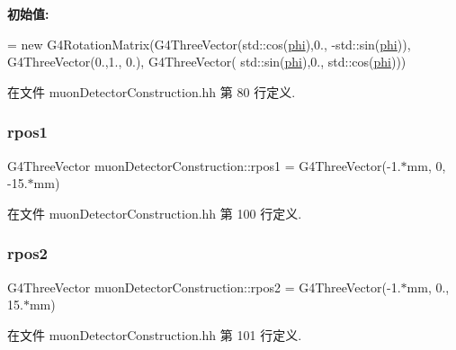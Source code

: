 {\bfseries 初始值\+:}
\begin{DoxyCode}
= 
    \textcolor{keyword}{new} G4RotationMatrix(G4ThreeVector(std::cos(\hyperlink{classmuonDetectorConstruction_ae2913b2b14fcbf88711169912921c19d}{phi}),0., -std::sin(\hyperlink{classmuonDetectorConstruction_ae2913b2b14fcbf88711169912921c19d}{phi})), 
    G4ThreeVector(0.,1., 0.), G4ThreeVector( std::sin(\hyperlink{classmuonDetectorConstruction_ae2913b2b14fcbf88711169912921c19d}{phi}),0., std::cos(\hyperlink{classmuonDetectorConstruction_ae2913b2b14fcbf88711169912921c19d}{phi})))
\end{DoxyCode}


在文件 muon\+Detector\+Construction.\+hh 第 80 行定义.

\mbox{\label{classmuonDetectorConstruction_a3a49ae955ac065b568c7db42c570cd75}} 
\subsubsection{\texorpdfstring{rpos1}{rpos1}}
{\footnotesize\ttfamily G4\+Three\+Vector muon\+Detector\+Construction\+::rpos1 = G4\+Three\+Vector(-\/1.$\ast$mm, 0, -\/15.$\ast$mm)\hspace{0.3cm}{\ttfamily [private]}}



在文件 muon\+Detector\+Construction.\+hh 第 100 行定义.

\mbox{\label{classmuonDetectorConstruction_a95836d910644b3c728b3fe4c0d2bdc28}} 
\subsubsection{\texorpdfstring{rpos2}{rpos2}}
{\footnotesize\ttfamily G4\+Three\+Vector muon\+Detector\+Construction\+::rpos2 = G4\+Three\+Vector(-\/1.$\ast$mm, 0., 15.$\ast$mm)\hspace{0.3cm}{\ttfamily [private]}}



在文件 muon\+Detector\+Construction.\+hh 第 101 行定义.

\mbox{\label{classmuonDetectorConstruction_ad5f560a56957f9d7a4d2b32a67130dd7}} 
